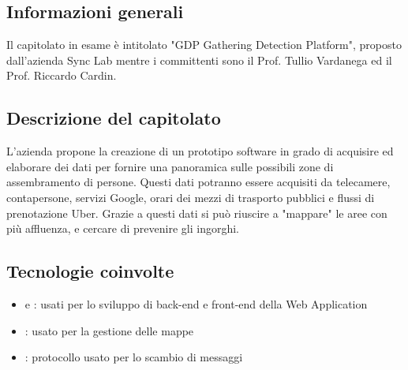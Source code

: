 \subsection{Informazioni generali}
Il capitolato in esame è intitolato "GDP Gathering Detection Platform", proposto dall'azienda Sync Lab mentre i committenti sono il Prof. Tullio Vardanega ed il Prof. Riccardo Cardin.
\subsection{Descrizione del capitolato}
L'azienda propone la creazione di un prototipo software in grado di acquisire ed elaborare dei dati per fornire una panoramica sulle possibili zone di assembramento di persone.
Questi dati potranno essere acquisiti da telecamere, contapersone, servizi Google, orari dei mezzi di trasporto pubblici e flussi di prenotazione Uber.
Grazie a questi dati si può riuscire a "mappare" le aree con più affluenza, e cercare di prevenire gli ingorghi.
\subsection{Tecnologie coinvolte}
\begin{itemize}
    \item {} e : usati per lo sviluppo di back-end e front-end della Web Application
    \item {}: usato per la gestione delle mappe
    \item {}: protocollo usato per lo scambio di messaggi

\end{itemize}
